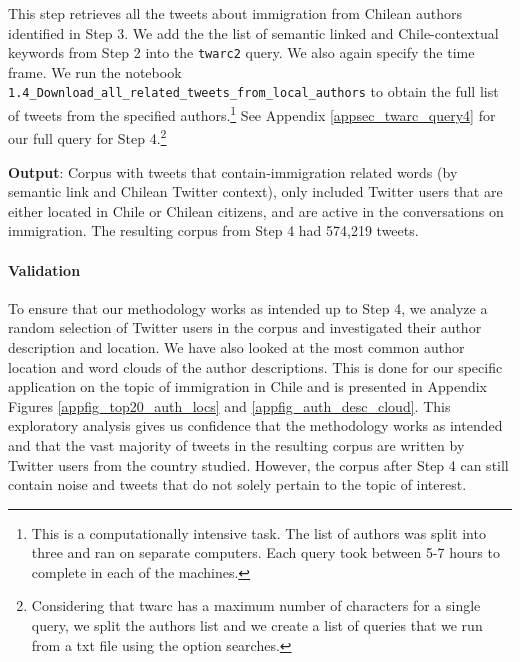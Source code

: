         This step retrieves all the tweets about immigration from Chilean authors identified in Step 3. We add the the list of semantic linked and Chile-contextual keywords from Step 2 into the \texttt{twarc2} query. We also again specify the time frame. We run the notebook \texttt{1.4\_Download\_all\_related\_tweets\_from\_local\_authors} to obtain the full list of tweets from the specified authors.\footnote{This is a computationally intensive task. The list of authors was split into three and ran on separate computers. Each query took between 5-7 hours to complete in each of the machines.}
        See Appendix \ref{appsec_twarc_query4} for our full query for Step 4.\footnote{Considering that twarc has a maximum number of characters for a single query, we split the authors list and we create a list of queries that we run from a txt file using the option searches.}
        
        \newline\noindent
        
        \textbf{Output}: Corpus with tweets that contain-immigration related words (by semantic link and Chilean Twitter context), 
        only included Twitter users that are either located in Chile or Chilean citizens, and are active in the conversations on immigration. The resulting corpus from Step 4 had 574,219 tweets.
        
        \paragraph{Validation}
            
            To ensure that our methodology works as intended up to Step 4, we analyze a random selection of Twitter users in the corpus and investigated their author description and location. We have also looked at the most common author location and word clouds of the author descriptions. This is done for our specific application on the topic of immigration in Chile and is presented in
            Appendix Figures \ref{appfig_top20_auth_locs} and \ref{appfig_auth_desc_cloud}. This exploratory analysis gives us confidence that the methodology works as intended and that the vast majority of tweets in the resulting corpus are written by Twitter users from the country studied. However, the corpus after Step 4 can still contain noise and tweets that do not solely pertain to the topic of interest.
        
                                

